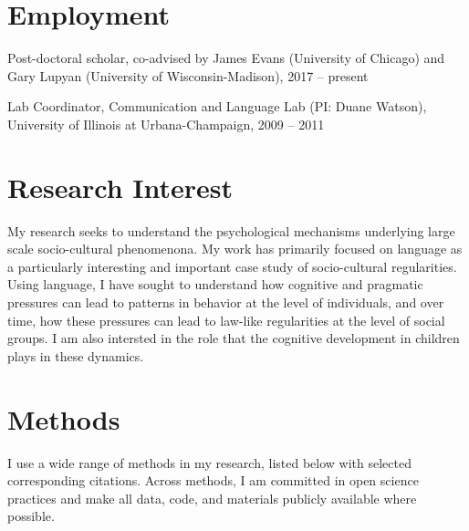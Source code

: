 \documentclass[letterpaper]{article}
\renewenvironment{itemize}{
  \begin{list}{}{
    \setlength{\leftmargin}{1.5em}
  }
}{
  \end{list}
}
\begin{document}
\section*{Employment}

\begin{itemize}
\item Post-doctoral scholar, co-advised by James Evans (University of Chicago) and Gary Lupyan (University of Wisconsin-Madison), 2017 -- present

\item Lab Coordinator, Communication and Language Lab (PI: Duane Watson), University of Illinois at Urbana-Champaign,  2009 -- 2011

\end{itemize}

\section*{Research Interest}


My research seeks to understand the psychological mechanisms underlying large scale socio-cultural phenomenona. My work has primarily focused on language as a particularly interesting and important case study of socio-cultural regularities. Using language, I have sought to understand how cognitive and pragmatic pressures can lead to patterns in behavior at the level of individuals, and over time, how these pressures can lead to law-like regularities at the level of social groups. I am also intersted in the role that the cognitive development in children plays in these dynamics.

\section*{Methods}
I use a wide range of methods in my research, listed below with selected corresponding citations. Across methods, I am committed in open science practices and make all data, code, and materials publicly available where possible. 
\end{document}
